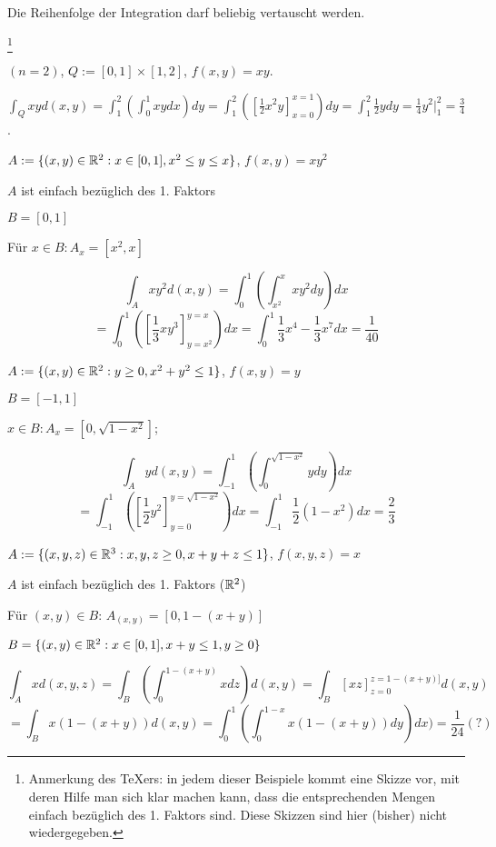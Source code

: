\documentclass[a4paper,twoside,DIV15,BCOR12mm]{scrbook}
\begin{document}
Die Reihenfolge der Integration darf beliebig vertauscht werden.
\begin{beispiel}\footnote{Anmerkung des \TeX{}ers: in jedem dieser Beispiele kommt eine Skizze vor, mit deren Hilfe man sich klar machen kann, dass die entsprechenden Mengen einfach bezüglich des 1. Faktors sind. Diese Skizzen sind hier (bisher) nicht wiedergegeben.}

\begin{liste}

\item $(n = 2)$, $Q:=[0,1]\times[1,2]$, $f(x,y)=xy$.

$\int_Q xy d(x,y) = \int_1^2(\int_0^1 xydx)dy = \int_1^2([\frac{1}{2}x^2y]_{x=0}^{x=1})dy = \int_1^2\frac{1}{2}ydy = \frac{1}{4}y^2|_1^2 = \frac{3}{4}$.

\item $A:=\{(x,y)\in\mathbb{R}^2:x\in[0,1],x^2\leq y\leq x\}$, $f(x,y)=xy^2$

$A$ ist einfach bezüglich des 1. Faktors

$B=[0,1]$

Für $x\in B:A_x=[x^2,x]$

\[\int_A xy^2d(x,y) = \int_0^1(\int_{x^2}^x xy^2dy)dx\]
\[=\int_0^1([\frac{1}{3}xy^3]_{y=x^2}^{y=x})dx = \int_0^1\frac{1}{3}x^4-\frac{1}{3}x^7dx = \frac{1}{40}\]

\item $A:=\{(x,y)\in\mathbb{R}^2:y\geq 0, x^2+y^2 \leq 1\}$, $f(x,y)=y$

$B=[-1,1]$

$x\in B: A_x=[0,\sqrt{1-x^2}]$;

\[\int_A yd(x,y)=\int_{-1}^1(\int_0^{\sqrt{1-x^2}}ydy)dx\]
\[= \int_{-1}^1([\frac{1}{2}y^2]_{y=0}^{y=\sqrt{1-x^2}})dx = \int_{-1}^1\frac{1}{2}(1-x^2)dx=\frac{2}{3}\]

\item $A:=\{(x,y,z)\in\mathbb{R}^3:x,y,z\geq 0, x+y+z\leq 1\}$, $f(x,y,z)=x$

$A$ ist einfach bezüglich des 1. Faktors ($\mathbb{R}^2$)

Für $(x,y)\in B$: $A_{(x,y)}=[0,1-(x+y)]$

$B = \{(x,y)\in\mathbb{R}^2:x\in[0,1], x+y \leq 1, y\geq 0\}$

\[\int_Axd(x,y,z)=\int_B(\int_0^{1-(x+y)}xdz)d(x,y)= \int_B[xz]_{z=0}^{z=1-(x+y)]}d(x,y)\]
\[= \int_Bx(1-(x+y))d(x,y)=\int_0^1(\int_0^{1-x}x(1-(x+y))dy)dx)=\frac{1}{24} (?)\]
\end{liste}
\end{beispiel}
\end{document}
